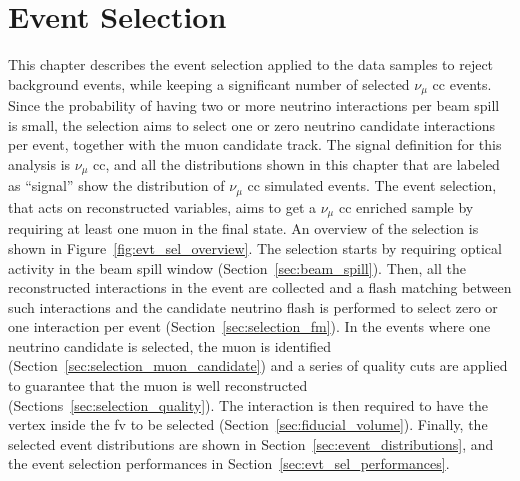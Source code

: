 \chapter{Event Selection}
\label{ch:event_selection}



This chapter describes the event selection applied to the data samples 
to reject background events, while keeping a significant number of selected $\nu_\mu$ \acrshort{cc} events.
Since the probability of having two or more neutrino interactions per beam spill is small, the selection aims to select one or zero neutrino candidate interactions per event, together with the muon candidate track.
The signal definition for this analysis is $\nu_\mu$ \acrshort{cc}, and all the distributions shown in this chapter that are labeled as ``signal'' show the distribution of $\nu_\mu$ \acrshort{cc} simulated events. The event selection, that acts on reconstructed variables, aims to get a $\nu_\mu$ \acrshort{cc} enriched sample by requiring at least one muon in the final state. 
An overview of the selection is shown in Figure~\ref{fig:evt_sel_overview}. The selection starts by requiring optical activity in the beam spill window (Section~\ref{sec:beam_spill}). Then, all the reconstructed interactions in the event are collected and a flash matching between such interactions and  the candidate neutrino flash is performed to select zero or one interaction per event (Section~\ref{sec:selection_fm}). In the events where one neutrino candidate is selected, the muon is identified (Section~\ref{sec:selection_muon_candidate}) and a series of quality cuts are applied to guarantee that the muon is well reconstructed (Sections~\ref{sec:selection_quality}). The interaction is then required to have the vertex inside the \acrshort{fv} to be selected (Section~\ref{sec:fiducial_volume}).
Finally, the selected event distributions are shown in Section~\ref{sec:event_distributions}, and the event selection performances in Section~\ref{sec:evt_sel_performances}.



